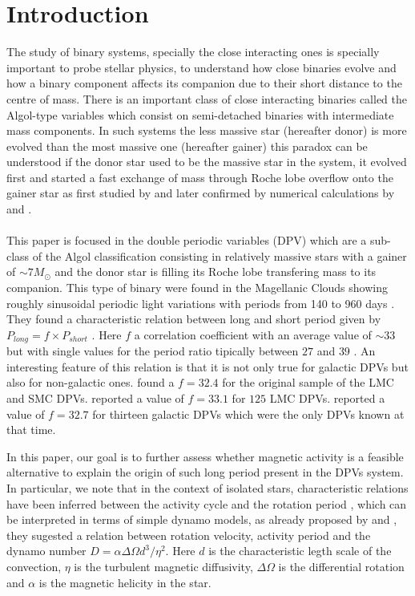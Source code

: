 \section{Introduction}

The study of binary systems, specially the close interacting ones is specially important to probe stellar physics, to understand how close binaries evolve and how a binary component affects its companion due to their short distance to the centre of mass. There is an important class of close interacting binaries called the Algol-type variables which consist on semi-detached binaries with intermediate mass components. In such systems the less massive star (hereafter donor) is more evolved than the most massive one (hereafter gainer) this paradox can be understood if the donor star used to be the massive star in the system, it evolved first and started a fast exchange of mass through Roche lobe overflow onto the gainer star as first studied by \citet{crawford1955} and later confirmed by numerical calculations by \citet{kippenhahn} and \citet{eggleton2006}.\\
\\
\indent This paper is focused in the double periodic variables (DPV) which are a sub-class of the Algol classification consisting in relatively massive stars with a gainer of $\sim 7 M_{\odot}$ and the donor star is filling its Roche lobe transfering mass to its companion. This type of binary were found in the Magellanic Clouds showing roughly sinusoidal periodic light variations with periods from 140 to 960 days \citep{mennickent2003}. They found a characteristic relation between long and short period given by $P_{long}= f \times P_{short}$ \citep{mennickent2003}. Here $f$ a correlation coefficient with an average value of $\sim 33$ but with single values for the period ratio tipically between $27$ and $39$ \citep{mennick2016a}. An interesting feature of this relation is that it is not only true for galactic DPVs but also for non-galactic ones. \citet{mennickent2003} found a $f=32.4$ for the original sample of the LMC and SMC DPVs. \citet{poleski2010} reported a value of $f=33.1$ for $125$ LMC DPVs. \citet{mennickent2012} reported a value of $f=32.7$ for thirteen galactic DPVs which were the only DPVs known at that time.




\indent In this paper, our goal is to further assess whether magnetic activity is a feasible alternative to explain the origin of such long period present in the DPVs system. In particular, we note that in the context of isolated stars, characteristic relations have been inferred between the activity cycle and the rotation period \citep{saar1999, bohm2007}, which can be interpreted in terms of simple dynamo models, as already proposed by \citet{soon1993} and \citet{baliunas1996}, they sugested a relation between rotation velocity, activity period and the dynamo number $D=\alpha \Delta\Omega d^{3}/\eta^{2}$. Here $d$ is the characteristic legth scale of the convection, $\eta$ is the turbulent magnetic diffusivity, $\Delta\Omega$ is the differential rotation and $\alpha$ is the magnetic helicity in the star. 
